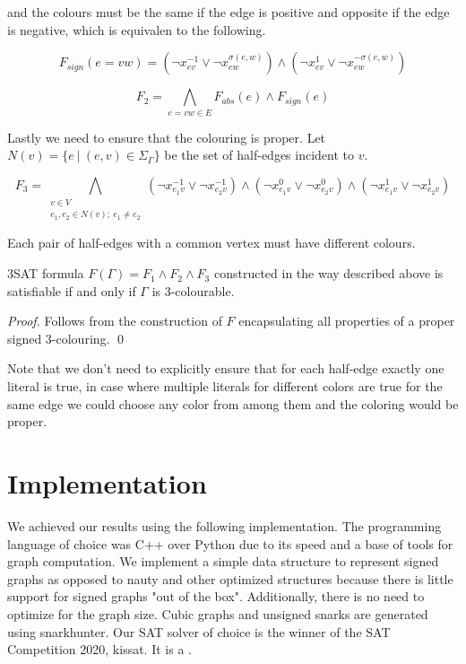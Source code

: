 and the colours must be the same if the edge is positive and opposite if the edge is negative, which is equivalen to the following.

$$F _{sign} (e = vw) = (\neg x^{-1}_{ev} \lor \neg x^{\sigma (e, w)}_{ew}) \land (\neg x^{1}_{ev} \lor \neg x^{-\sigma (e, w)}_{ew})$$

$$F_2 = \bigwedge _{e = vw \in E} F _{abs} (e) \wedge F _{sign} (e)$$

Lastly we need to ensure that the colouring is proper. Let $N(v) = \{e ~|~ (e,v) \in \Sigma _{\Gamma}\}$ be the set of half-edges incident to $v$.

$$F_3 = \bigwedge _{\substack{v \in V \\ e_1, e_2 \in N(v); ~ e_1 \neq e_2}} (\neg x^{-1}_{e_1v} \lor \neg x^{-1}_{e_2v}) \land (\neg x^{0}_{e_1v} \lor \neg x^{0}_{e_2v}) \land (\neg x^{1}_{e_1v} \lor \neg x^{1}_{e_2v}) $$

Each pair of half-edges with a common vertex must have different colours.

\begin{theorem}
    3SAT formula $F(\Gamma) = F_1 \wedge F_2 \wedge F_3$ constructed in the way described above is satisfiable if and only if $\Gamma$ is 3-colourable.
\end{theorem}

\textit{Proof.} Follows from the construction of $F$ encapsulating all properties of a proper signed 3-colouring. \qed

Note that we don't need to explicitly ensure that for each half-edge exactly one literal is true, in case where multiple literals for different colors are true for the same edge we could choose any color from among them and the coloring would be proper.

\section{Implementation}

We achieved our results using the following implementation. The programming language of choice was C++ over Python due to its speed and a base of tools for graph computation. We implement a simple data structure to represent signed graphs as opposed to nauty and other optimized structures because there is little support for signed graphs "out of the box". Additionally, there is no need to optimize for the graph size. Cubic graphs and unsigned snarks are generated using snarkhunter. Our SAT solver of choice is the winner of the SAT Competition 2020\cite{SAT-Competition-2020-solvers}, kissat. It is a .
